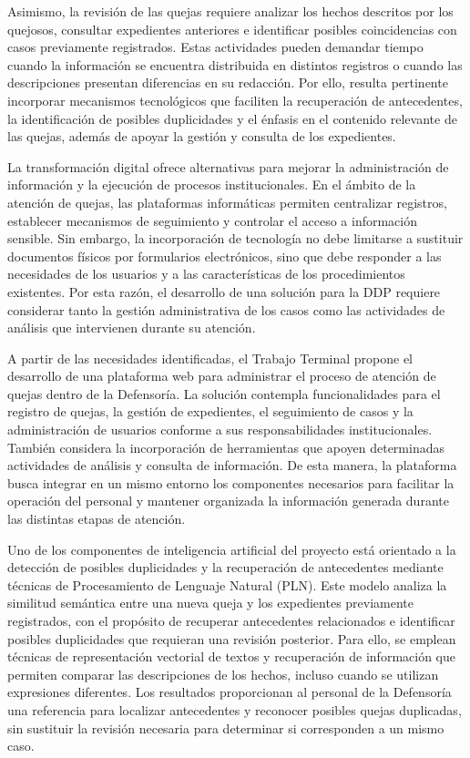 Asimismo, la revisión de las quejas requiere analizar los hechos descritos por los quejosos, consultar expedientes anteriores e identificar posibles coincidencias con casos previamente registrados. Estas actividades pueden demandar tiempo cuando la información se encuentra distribuida en distintos registros o cuando las descripciones presentan diferencias en su redacción. Por ello, resulta pertinente incorporar mecanismos tecnológicos que faciliten la recuperación de antecedentes, la identificación de posibles duplicidades y el énfasis en el contenido relevante de las quejas, además de apoyar la gestión y consulta de los expedientes.

La transformación digital ofrece alternativas para mejorar la administración de información y la ejecución de procesos institucionales. En el ámbito de la atención de quejas, las plataformas informáticas permiten centralizar registros, establecer mecanismos de seguimiento y controlar el acceso a información sensible. Sin embargo, la incorporación de tecnología no debe limitarse a sustituir documentos físicos por formularios electrónicos, sino que debe responder a las necesidades de los usuarios y a las características de los procedimientos existentes. Por esta razón, el desarrollo de una solución para la DDP requiere considerar tanto la gestión administrativa de los casos como las actividades de análisis que intervienen durante su atención.

A partir de las necesidades identificadas, el Trabajo Terminal propone el desarrollo de una plataforma web para administrar el proceso de atención de quejas dentro de la Defensoría. La solución contempla funcionalidades para el registro de quejas, la gestión de expedientes, el seguimiento de casos y la administración de usuarios conforme a sus responsabilidades institucionales. También considera la incorporación de herramientas que apoyen determinadas actividades de análisis y consulta de información. De esta manera, la plataforma busca integrar en un mismo entorno los componentes necesarios para facilitar la operación del personal y mantener organizada la información generada durante las distintas etapas de atención.

Uno de los componentes de inteligencia artificial del proyecto está orientado a la detección de posibles duplicidades y la recuperación de antecedentes mediante técnicas de Procesamiento de Lenguaje Natural (PLN). Este modelo analiza la similitud semántica entre una nueva queja y los expedientes previamente registrados, con el propósito de recuperar antecedentes relacionados e identificar posibles duplicidades que requieran una revisión posterior. Para ello, se emplean técnicas de representación vectorial de textos y recuperación de información que permiten comparar las descripciones de los hechos, incluso cuando se utilizan expresiones diferentes. Los resultados proporcionan al personal de la Defensoría una referencia para localizar antecedentes y reconocer posibles quejas duplicadas, sin sustituir la revisión necesaria para determinar si corresponden a un mismo caso.

